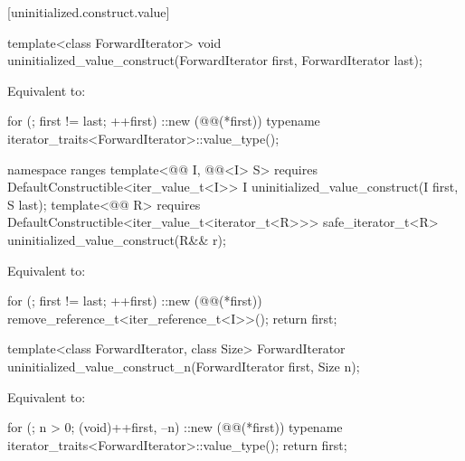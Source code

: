 [uninitialized.construct.value]{}

%
\begin{itemdecl}
template<class ForwardIterator>
  void uninitialized_value_construct(ForwardIterator first, ForwardIterator last);
\end{itemdecl}

\begin{itemdescr}
\pnum
\effects
Equivalent to:
\begin{codeblock}
for (; first != last; ++first)
  ::new (@@(*first))
    typename iterator_traits<ForwardIterator>::value_type();
\end{codeblock}
\end{itemdescr}

%
\begin{itemdecl}
namespace ranges {
  template<@@ I, @@<I> S>
      requires DefaultConstructible<iter_value_t<I>>
    I uninitialized_value_construct(I first, S last);
  template<@@ R>
      requires DefaultConstructible<iter_value_t<iterator_t<R>>>
    safe_iterator_t<R> uninitialized_value_construct(R&& r);
}
\end{itemdecl}

\begin{itemdescr}
\pnum
\effects Equivalent to:
\begin{codeblock}
for (; first != last; ++first)
  ::new (@@(*first)) remove_reference_t<iter_reference_t<I>>();
return first;
\end{codeblock}
\end{itemdescr}

%
\begin{itemdecl}
template<class ForwardIterator, class Size>
  ForwardIterator uninitialized_value_construct_n(ForwardIterator first, Size n);
\end{itemdecl}

\begin{itemdescr}
\pnum
\effects
Equivalent to:
\begin{codeblock}
for (; n > 0; (void)++first, --n)
  ::new (@@(*first))
    typename iterator_traits<ForwardIterator>::value_type();
return first;
\end{codeblock}
\end{itemdescr}

